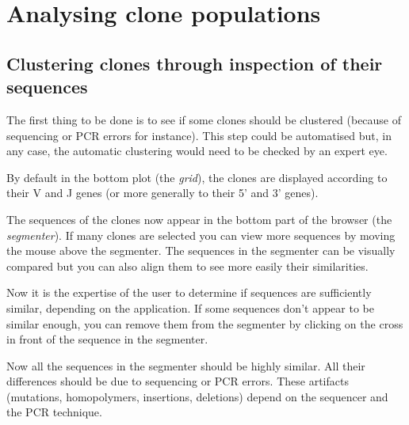 \documentclass[11pt]{article}
\begin{document}
\section{Analysing clone populations}

\subsection{Clustering clones through inspection of their sequences}

The first thing to be done is to see if some clones should be clustered (because
of sequencing or PCR errors for instance). This step could be automatised
but, in any case, the automatic clustering would need to be checked by an expert
eye.

By default in the bottom plot (the \textit{grid}), the clones
  are displayed according to their V and J genes (or more generally to their
  5' and 3' genes). 


The sequences of the clones now appear in the bottom part of the browser (the
\textit{segmenter}). If many clones are selected you can view more sequences
by moving the mouse above the segmenter.
The sequences in the segmenter can be visually compared but you can also align
them to see more easily their similarities.

Now it is the expertise of the user to determine if sequences are sufficiently
similar, depending on the application. If some sequences don't appear to be similar enough, you can remove
them from the segmenter by clicking on the cross in front of the sequence in
the segmenter.

Now all the sequences in the segmenter should be highly similar. All their
differences should be due to sequencing or PCR errors.
These artifacts (mutations, homopolymers, insertions, deletions)
depend on the sequencer and the PCR technique.

\end{document}
